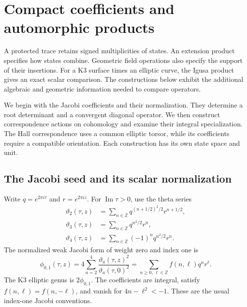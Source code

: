 \chapter{Compact coefficients and automorphic products}
\label{mht:ch:compact-examples}

A protected trace retains signed multiplicities of states.
An extension product specifies how states combine.
Geometric field operations also specify the support of their insertions.
For a K3 surface times an elliptic curve, the Igusa product gives an
exact scalar comparison. The constructions below exhibit the additional
algebraic and geometric information needed to compare operators.

We begin with the Jacobi coefficients and their normalization.
They determine a root determinant and a convergent diagonal operator.
We then construct correspondence actions on cohomology and examine
their integral specialization. The Hall correspondence uses a common
elliptic torsor, while its coefficients require a compatible orientation.
Each construction has its own state space and unit.

\section{The Jacobi seed and its scalar normalization}

Write \(q=e^{2\pi i\tau}\) and \(r=e^{2\pi iz}\).
For \(\operatorname{Im}\tau>0\), use the theta series
\[
\begin{aligned}
 \vartheta_2(\tau,z)&=\sum_{n\in\mathbb Z}
             q^{(n+1/2)^2/2}r^{n+1/2},\\
 \vartheta_3(\tau,z)&=\sum_{n\in\mathbb Z}q^{n^2/2}r^n,\\
 \vartheta_4(\tau,z)&=\sum_{n\in\mathbb Z}(-1)^nq^{n^2/2}r^n.
\end{aligned}
\]
The normalized weak Jacobi form of weight zero and index one is
\begin{equation}\label{mht:eq:compact-jacobi}
 \phi_{0,1}(\tau,z)
   =4\sum_{a=2}^4
       \frac{\vartheta_a(\tau,z)^2}{\vartheta_a(\tau,0)^2}
   =\sum_{n\geq0,\,\ell\in\mathbb Z}f(n,\ell)q^nr^\ell.
\end{equation}
The K3 elliptic genus is \(2\phi_{0,1}\).
The coefficients are integral, satisfy \(f(n,\ell)=f(n,-\ell)\),
and vanish for \(4n-\ell^2<-1\).
These are the usual index-one Jacobi conventions.

